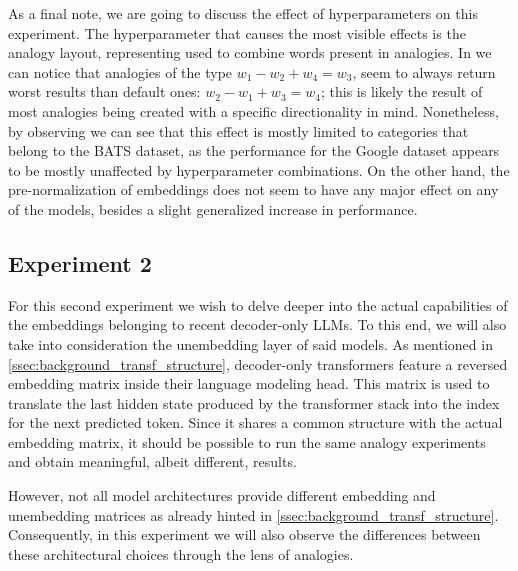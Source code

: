 As a final note, we are going to discuss the effect of hyperparameters on this experiment.
The hyperparameter that causes the most visible effects is the analogy layout, representing  used to combine words present in analogies.
In  we can notice that analogies of the type $w_1 - w_2 + w_4 = w_3$, seem to always return worst results than default ones: $w_2 - w_1 + w_3 = w_4$; this is likely the result of most analogies being created with a specific directionality in mind.
Nonetheless, by observing  we can see that this effect is mostly limited to categories that belong to the BATS dataset, as the performance for the Google dataset appears to be mostly unaffected by hyperparameter combinations.
On the other hand, the pre-normalization of embeddings does not seem to have any major effect on any of the models, besides a slight generalized increase in performance.

\subsection{Experiment 2}\label{ssec:exp_emb_exp2}

For this second experiment we wish to delve deeper into the actual capabilities of the embeddings belonging to recent decoder-only LLMs.
To this end, we will also take into consideration the unembedding layer of said models.
As mentioned in \cref{ssec:background_transf_structure}, decoder-only transformers feature a reversed embedding matrix inside their language modeling head.
This matrix is used to translate the last hidden state produced by the transformer stack into the index for the next predicted token.
Since it shares a common structure with the actual embedding matrix, it should be possible to run the same analogy experiments and obtain meaningful, albeit different, results.

However, not all model architectures provide different embedding and unembedding matrices as already hinted in \cref{ssec:background_transf_structure}.
Consequently, in this experiment we will also observe the differences between these architectural choices through the lens of analogies.

